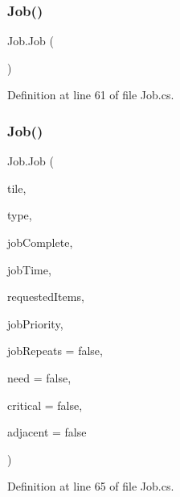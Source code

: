 \subsubsection{\texorpdfstring{Job()}{Job()}\hspace{0.1cm}{\footnotesize\ttfamily [1/4]}}
{\footnotesize\ttfamily Job.\+Job (\begin{DoxyParamCaption}{ }\end{DoxyParamCaption})}



Definition at line 61 of file Job.\+cs.

\mbox{\label{class_job_a67710e7b5957e833e85730b6871b76e9}} 
\subsubsection{\texorpdfstring{Job()}{Job()}\hspace{0.1cm}{\footnotesize\ttfamily [2/4]}}
{\footnotesize\ttfamily Job.\+Job (\begin{DoxyParamCaption}\item[{\hyperlink{class_tile}{Tile}}]{tile,  }\item[{string}]{type,  }\item[{Action$<$ \hyperlink{class_job}{Job} $>$}]{job\+Complete,  }\item[{float}]{job\+Time,  }\item[{\hyperlink{class_project_porcupine_1_1_jobs_1_1_requested_item}{Requested\+Item} \mbox{[}$\,$\mbox{]}}]{requested\+Items,  }\item[{\hyperlink{class_job_a9c7ab1966c2a0a1d29a7f5822cbca45a}{Job.\+Job\+Priority}}]{job\+Priority,  }\item[{bool}]{job\+Repeats = {\ttfamily false},  }\item[{bool}]{need = {\ttfamily false},  }\item[{bool}]{critical = {\ttfamily false},  }\item[{bool}]{adjacent = {\ttfamily false} }\end{DoxyParamCaption})}



Definition at line 65 of file Job.\+cs.

\mbox{\label{class_job_af831acec06ac9895b3e6fb0dccb412b7}} 
